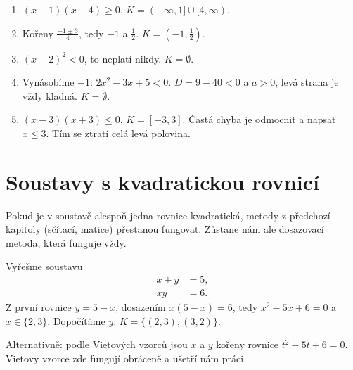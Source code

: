 \begin{solution}
  \begin{enumerate}[label=(\alph*)]
    \item $(x - 1)(x - 4)\geq 0$, $K = (-\infty, 1]\cup[4, \infty)$.
    \item Kořeny $\frac{-1\pm 3}{4}$, tedy $-1$ a $\frac{1}{2}$. $K = \left(-1, \frac{1}{2}\right)$.
    \item ${(x - 2)}^2 < 0$, to neplatí nikdy. $K = \emptyset$.
    \item Vynásobíme $-1$: $2x^2 - 3x + 5 < 0$. $D = 9 - 40 < 0$ a $a > 0$, levá strana je vždy kladná. $K = \emptyset$.
    \item $(x - 3)(x + 3)\leq 0$, $K = [-3, 3]$. Častá chyba je odmocnit a napsat $x\leq 3$. Tím se ztratí celá levá polovina.
  \end{enumerate}
\end{solution}

\section{Soustavy s kvadratickou rovnicí}\label{sec:soustavy-kvadraticke}

Pokud je v soustavě alespoň jedna rovnice kvadratická, metody z předchozí kapitoly (sčítací, matice) přestanou fungovat. Zůstane nám ale dosazovací metoda, která funguje vždy.

\begin{example}
  Vyřešme soustavu
  \begin{align*}
    x + y &= 5,\\
    xy &= 6.
  \end{align*}
  Z první rovnice $y = 5 - x$, dosazením $x(5 - x) = 6$, tedy $x^2 - 5x + 6 = 0$ a $x\in\{2, 3\}$. Dopočítáme $y$: $K = \{(2, 3), (3, 2)\}$.

  Alternativně: podle Vietových vzorců jsou $x$ a $y$ kořeny rovnice $t^2 - 5t + 6 = 0$. Vietovy vzorce zde fungují obráceně a ušetří nám práci.
\end{example}

